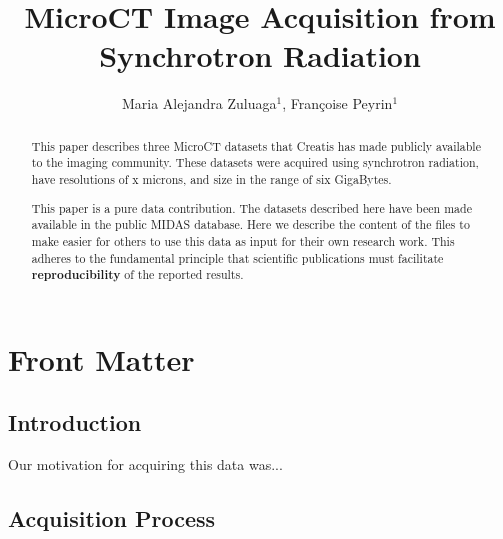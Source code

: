 \documentclass{InsightArticle}
\title{MicroCT Image Acquisition from Synchrotron Radiation}
\author{Maria Alejandra Zuluaga$^{1}$, Fran\c{c}oise Peyrin$^{1}$}
\newcommand{\IJhandlerIDnumber}{3063}
\begin{document}
%
%
\IJhandlefooter{\IJhandlerIDnumber}


\ifpdf
\else
\fi


\maketitle


\ifhtml
\chapter*{Front Matter\label{front}}
\fi


\begin{abstract}
\noindent
This paper describes three MicroCT datasets that Creatis has made publicly
available to the imaging community. These datasets were acquired using
synchrotron radiation, have resolutions of x microns, and size in the range of
six GigaBytes.

This paper is a pure data contribution. The datasets described here have been
made available in the public MIDAS database. Here we describe the content of
the files to make easier for others to use this data as input for their own
research work.  This adheres to the fundamental principle that scientific
publications must facilitate \textbf{reproducibility} of the reported results.
\end{abstract}

\tableofcontents

\section{Introduction}

Our motivation for acquiring this data was...

\section{Acquisition Process}
\end{document}
